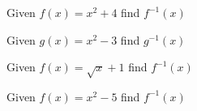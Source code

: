 \item Given $f(x)=x^2+4$ find $f^{-1}(x)$
\item Given $g(x)=x^2-3$ find $g^{-1}(x)$
\item Given $f(x)=\sqrt{x}+1$ find $f^{-1}(x)$
\item Given $f(x)=x^2-5$ find $f^{-1}(x)$
